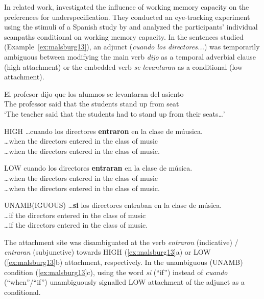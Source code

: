 \documentclass{cambridge7A}\usepackage[]{graphicx}\usepackage[]{color}
\begin{document}
In related work, \cite{MalsburgVasishth2013} investigated the influence of working memory capacity on the preferences for underspecification.
They conducted an eye-tracking experiment using the stimuli of a Spanish study by \cite{Meseguer2002} and analyzed the participants' individual scanpaths \citep{MalsburgVasishth2011} conditional on working memory capacity. 
In the sentences studied (Example~\ref{ex:malsburg13}), an adjunct (\textit{cuando los directores...}) was temporarily ambiguous between modifying the main verb \textit{dijo} as a temporal adverbial clause (high attachment) or the embedded verb \textit{se levantaran} as a conditional (low attachment). 

\begin{exe}
\ex\label{ex:malsburg13preamble} 
\gll El profesor dijo que los alumnos {se levantaran} del asiento\\
     The professor said that the students {stand up} from seat \\
\glt `The teacher said that the students had to stand up from their seats\dots'
\end{exe}

\begin{exe}
\ex\label{ex:malsburg13} 
\begin{xlist}
\item HIGH
\gll \dots cuando los directores \textbf{entraron} en la clase de m{\'u}usica. \\
\dots when the directors entered in the class of music\\
\glt \dots when the directors entered in the class of music.
\item LOW
\gll cuando los directores \textbf{entraran} en la clase de m{\'u}sica.\\
\dots when the directors entered in the class of music\\
\glt \dots when the directors entered in the class of music.
\item  UNAMB(IGUOUS)
\gll \dots \textbf{si} los directores entraban en la clase de m{\'u}sica.\\
\dots if the directors entered in the class of music\\
\glt \dots if the directors entered in the class of music.
\end{xlist}
\end{exe}

The attachment site was disambiguated at the verb \textit{entraron} (indicative) / \textit{entraran} (subjunctive) towards HIGH (\ref{ex:malsburg13}a) or LOW (\ref{ex:malsburg13}b) attachment, respectively. In the unambiguous (UNAMB) condition (\ref{ex:malsburg13}c), using the word \textit{si} (``if'') instead of \textit{cuando} (``when''/``if'') unambiguously signalled LOW attachment of the adjunct as a conditional.
\end{document}
